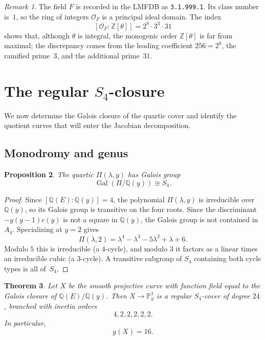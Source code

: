 \documentclass[11pt,letterpaper]{article}
\theoremstyle{plain}
\newtheorem{theorem}{Theorem}[section]
\newtheorem{proposition}[theorem]{Proposition}
\theoremstyle{remark}
\newtheorem{remark}[theorem]{Remark}
\newcommand{\QQ}{\mathbb{Q}}
\newcommand{\ZZ}{\mathbb{Z}}
\newcommand{\PP}{\mathbb{P}}
\newcommand{\Gal}{\operatorname{Gal}}
\begin{document}
\begin{remark}\label{rem:cubic-field}
The field \(F\) is recorded in the LMFDB \cite{LMFDB} as \texttt{3.1.999.1}. Its class number is~\(1\), so the ring of integers \(\mathcal O_F\) is a principal ideal domain. The index
\[
[\mathcal O_F:\ZZ[\theta]]=2^8\cdot 3^3\cdot 31
\]
shows that, although \(\theta\) is integral, the monogenic order \(\ZZ[\theta]\) is far from maximal; the discrepancy comes from the leading coefficient \(256=2^8\), the ramified prime~\(3\), and the additional prime~\(31\).
\end{remark}

\section{The regular \texorpdfstring{$S_4$}{S4}-closure}

We now determine the Galois closure of the quartic cover and identify the quotient curves that will enter the Jacobian decomposition.

\subsection{Monodromy and genus}

\begin{proposition}\label{prop:s4}
The quartic \(\Pi(\lambda,y)\) has Galois group
\[
\Gal(\Pi/\QQ(y))\cong S_4.
\]
\end{proposition}

\begin{proof}
Since \([\QQ(E):\QQ(y)]=4\), the polynomial \(\Pi(\lambda,y)\) is irreducible over \(\QQ(y)\), so its Galois group is transitive on the four roots. Since the discriminant \(-y(y-1)c(y)\) is not a square in \(\QQ(y)\), the Galois group is not contained in \(A_4\). Specializing at \(y=2\) gives
\[
\Pi(\lambda,2)=\lambda^4-\lambda^3-5\lambda^2+\lambda+6.
\]
Modulo \(5\) this is irreducible (a \(4\)-cycle), and modulo \(3\) it factors as a linear times an irreducible cubic (a \(3\)-cycle). A transitive subgroup of \(S_4\) containing both cycle types is all of~\(S_4\).
\end{proof}

\begin{theorem}\label{thm:closure}
Let \(X\) be the smooth projective curve with function field equal to the Galois closure of \(\QQ(E)/\QQ(y)\).
Then \(X\to\PP^1_y\) is a regular \(S_4\)-cover of degree \(24\), branched with inertia orders
\[
4,2,2,2,2,2.
\]
In particular,
\[
g(X)=16.
\]
\end{theorem}
\end{document}
